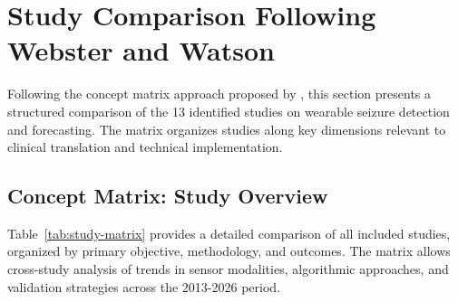 \section{Study Comparison Following Webster and Watson}
Following the concept matrix approach proposed by \parencite{websterAnalyzingPrepareFuture2002}, this section presents a structured comparison of the 13 identified studies on wearable seizure detection and forecasting. The matrix organizes studies along key dimensions relevant to clinical translation and technical implementation.

\subsection{Concept Matrix: Study Overview}

Table~\ref{tab:study-matrix} provides a detailed comparison of all included studies, organized by primary objective, methodology, and outcomes. The matrix allows cross-study analysis of trends in sensor modalities, algorithmic approaches, and validation strategies across the 2013-2026 period.

